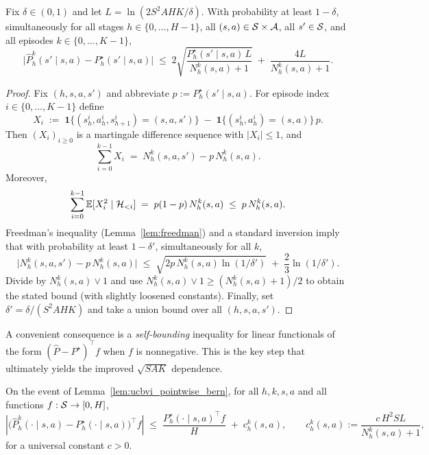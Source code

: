 \begin{lemma}
\label{lem:ucbvi_pointwise_bern}
Fix $\delta\in(0,1)$ and let $L=\ln(2S^2AHK/\delta)$.
With probability at least $1-\delta$, simultaneously for all stages $h\in\{0,\dots,H-1\}$,
all $(s,a)\in\mathcal{S}\times\mathcal{A}$, all $s'\in\mathcal{S}$, and all episodes $k\in\{0,\dots,K-1\}$,
\[
\big|\widehat P_h^k(s'\mid s,a)-P_h^\star(s'\mid s,a)\big|
\;\le\;
2\sqrt{\frac{P_h^\star(s'\mid s,a)\,L}{N_h^k(s,a)+1}}
\;+\;
\frac{4L}{N_h^k(s,a)+1}.
\]
\end{lemma}

\begin{proof}
Fix $(h,s,a,s')$ and abbreviate $p:=P_h^\star(s'\mid s,a)$.
For episode index $i\in\{0,\dots,K-1\}$ define
\[
X_i \;:=\; \mathbf{1}\{(s_h^i,a_h^i,s_{h+1}^i)=(s,a,s')\} \;-\; \mathbf{1}\{(s_h^i,a_h^i)=(s,a)\}\,p.
\]
Then $(X_i)_{i\ge 0}$ is a martingale difference sequence with $|X_i|\le 1$, and
\[
\sum_{i=0}^{k-1} X_i \;=\; N_h^k(s,a,s') - p\,N_h^k(s,a).
\]
Moreover,
\[
\sum_{i=0}^{k-1}\mathbb{E}[X_i^2\mid \mathcal{H}_{<i}]
\;=\;
p(1-p)\,N_h^k(s,a)
\;\le\;
p\,N_h^k(s,a).
\]
Freedman's inequality (Lemma~\ref{lem:freedman}) and a standard inversion imply that with probability at least $1-\delta'$,
simultaneously for all $k$,
\[
\big|N_h^k(s,a,s') - p\,N_h^k(s,a)\big|
\;\le\;
\sqrt{2p\,N_h^k(s,a)\ln(1/\delta')}
\;+\;
\frac{2}{3}\ln(1/\delta').
\]
Divide by $N_h^k(s,a)\vee 1$ and use $N_h^k(s,a)\vee 1 \ge (N_h^k(s,a)+1)/2$ to obtain the stated bound
(with slightly loosened constants). Finally, set $\delta'=\delta/(S^2AHK)$ and take a union bound over
all $(h,s,a,s')$.
\end{proof}

A convenient consequence is a \emph{self-bounding} inequality for linear functionals of the form
$(\widehat P-P^\star)^\top f$ when $f$ is nonnegative. This is the key step that ultimately yields
the improved $\sqrt{SAK}$ dependence.

\begin{lemma}
\label{lem:ucbvi_self_bounding}
On the event of Lemma~\ref{lem:ucbvi_pointwise_bern}, for all $h,k,s,a$ and all functions
$f:\mathcal{S}\to[0,H]$,
\[
\left|\big(\widehat P_h^k(\cdot\mid s,a)-P_h^\star(\cdot\mid s,a)\big)^\top f\right|
\;\le\;
\frac{P_h^\star(\cdot\mid s,a)^\top f}{H}
\;+\;
c_h^k(s,a),
\qquad
c_h^k(s,a):=\frac{c\,H^2SL}{N_h^k(s,a)+1},
\]
for a universal constant $c>0$.
\end{lemma}

